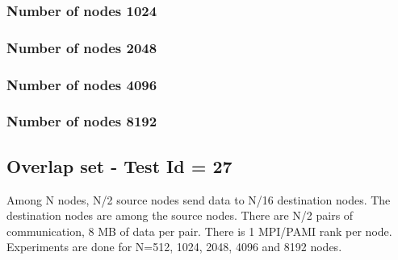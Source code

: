 \documentclass[letter]{article}
\begin{document}




\newpage

\subsubsection{Number of nodes 1024}





\newpage

\subsubsection{Number of nodes 2048}





\newpage

\subsubsection{Number of nodes 4096}





\newpage

\subsubsection{Number of nodes 8192}



%

\newpage

\subsection{Overlap set - Test Id = 27}

Among N nodes, N/2 source nodes send data to N/16 destination nodes. The destination nodes are among the source nodes. There are N/2 pairs of communication, 8 MB of data per pair. There is 1 MPI/PAMI rank per node. Experiments are done for N=512, 1024, 2048, 4096 and 8192 nodes.
\end{document}
